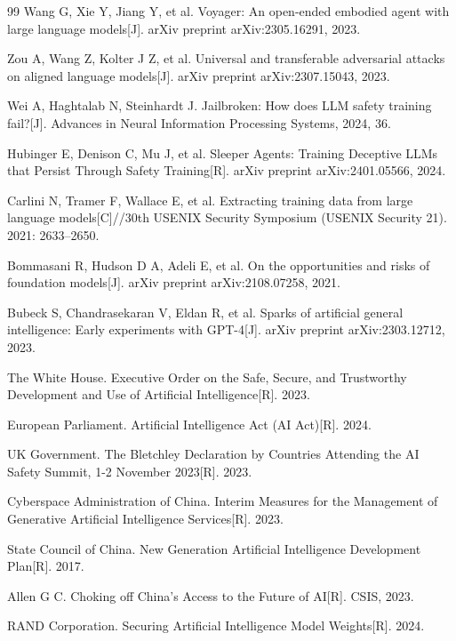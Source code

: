 \begin{thebibliography}{99}
 Wang G, Xie Y, Jiang Y, et al. Voyager: An open-ended embodied agent with large language models[J]. arXiv preprint arXiv:2305.16291, 2023.

 Zou A, Wang Z, Kolter J Z, et al. Universal and transferable adversarial attacks on aligned language models[J]. arXiv preprint arXiv:2307.15043, 2023.

 Wei A, Haghtalab N, Steinhardt J. Jailbroken: How does LLM safety training fail?[J]. Advances in Neural Information Processing Systems, 2024, 36.

 Hubinger E, Denison C, Mu J, et al. Sleeper Agents: Training Deceptive LLMs that Persist Through Safety Training[R]. arXiv preprint arXiv:2401.05566, 2024.

 Carlini N, Tramer F, Wallace E, et al. Extracting training data from large language models[C]//30th USENIX Security Symposium (USENIX Security 21). 2021: 2633--2650.

 Bommasani R, Hudson D A, Adeli E, et al. On the opportunities and risks of foundation models[J]. arXiv preprint arXiv:2108.07258, 2021.

 Bubeck S, Chandrasekaran V, Eldan R, et al. Sparks of artificial general intelligence: Early experiments with GPT-4[J]. arXiv preprint arXiv:2303.12712, 2023.

 The White House. Executive Order on the Safe, Secure, and Trustworthy Development and Use of Artificial Intelligence[R]. 2023.

 European Parliament. Artificial Intelligence Act (AI Act)[R]. 2024.

 UK Government. The Bletchley Declaration by Countries Attending the AI Safety Summit, 1-2 November 2023[R]. 2023.

 Cyberspace Administration of China. Interim Measures for the Management of Generative Artificial Intelligence Services[R]. 2023.

 State Council of China. New Generation Artificial Intelligence Development Plan[R]. 2017.

 Allen G C. Choking off China's Access to the Future of AI[R]. CSIS, 2023.

 RAND Corporation. Securing Artificial Intelligence Model Weights[R]. 2024.


\end{thebibliography}
